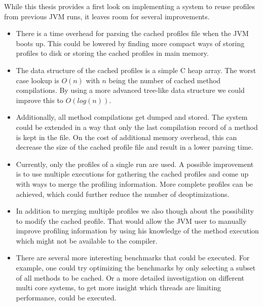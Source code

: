 While this thesis provides a first look on implementing a system to reuse profiles from previous JVM runs, it leaves room for several improvements.
\begin{itemize}
  \item There is a time overhead for parsing the cached profiles file when the JVM boots up. This could be lowered by finding more compact ways of storing profiles to disk or storing the cached profiles in main memory.
  \item The data structure of the cached profiles is a simple C heap array. The worst case lookup is $O(n)$ with $n$ being the number of cached method compilations. By using a more advanced tree-like data structure we could improve this to $O(log(n))$.
  \item Additionally, all method compilations get dumped and stored. The system could be extended in a way that only the last compilation record of a method is kept in the file. On the cost of additional memory overhead, this can decrease the size of the cached profile file and result in a lower parsing time.
  \item Currently, only the profiles of a single run are used. A possible improvement is to use multiple executions for gathering the cached profiles and come up with ways to merge the profiling information. More complete profiles can be achieved, which could further reduce the number of deoptimizations.
  \item In addition to merging multiple profiles we also though about the possibility to modify the cached profile. That would allow the JVM user to manually improve profiling information by using his knowledge of the method execution which might not be available to the compiler.
  \item There are several more interesting benchmarks that could be executed. For example, one could try optimizing the benchmarks by only selecting a subset of all methods to be cached. Or a more detailed investigation on different multi core systems, to get more insight which threads are limiting performance, could be executed.
\end{itemize}
